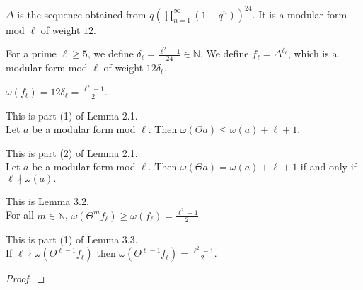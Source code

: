 \begin{definition}[Delta]
  \label{def:Delta}
  \leanok
  
  $\Delta$ is the sequence obtained from $q (\prod_{n = 1}^{\infty} (1 - q^n))^{24}$.
  It is a modular form mod $\ell$ of weight $12$. 
\end{definition}

\begin{definition}
  \label{def:f_l}
  \leanok
  For a prime $\ell \ge 5$, we define $\delta_\ell = \frac{\ell^2 - 1}{24} \in \mathbb{N}$. 
  We define $f_\ell = \Delta^{\delta_\ell}$, which is a modular form mod $\ell$ of weight $12 \delta_\ell$. 
\end{definition}

\begin{lemma}
  \label{lem:Filt_fl}
  \leanok
  $ \omega (f_\ell) = 12 \delta_\ell = \frac{\ell^2 - 1}{2}.$
\end{lemma}

\begin{theorem}
  \label{thm:Filt_Theta_bound}
  \leanok
  This is part (1) of Lemma 2.1. \\
  Let $a$ be a modular form mod $\ell$. Then $\omega (\Theta a) \le \omega (a) + \ell + 1$.
\end{theorem}

\begin{theorem}
  \label{thm:Filt_Theta_iff}
  \leanok
  This is part (2) of Lemma 2.1. \\
  Let $a$ be a modular form mod $\ell$. Then $\omega (\Theta a) = \omega (a) + \ell + 1$ 
  if and only if $\ell \nmid \omega (a).$
\end{theorem}

\begin{theorem}
  \label{thm:le_Filt_Theta_fl}
  \leanok
  This is Lemma 3.2. \\
  For all $m \in \mathbb{N}$, $\omega (\Theta^m f_\ell) \ge \omega (f_\ell) = \frac{\ell^2 - 1}{2}.$
\end{theorem} 


\begin{theorem}
  \label{thm:Filt_Theta_pow_l_sub_one} 
  \leanok
  This is part (1) of Lemma 3.3. \\
  If $\ell \nmid \omega (\Theta^{\ell - 1} f_\ell)$ then 
  $\omega (\Theta^{\ell - 1} f_\ell) = \frac{\ell^2 - 1}{2}.$
\end{theorem}
\begin{proof}
  \leanok
\end{proof}


